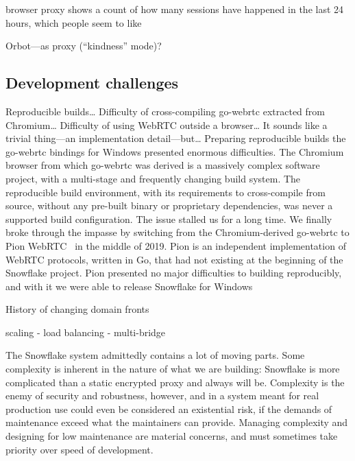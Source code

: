 \documentclass[letterpaper,twocolumn]{article}
\begin{document}
browser proxy shows a count of how many sessions
have happened in the last 24 hours,
which people seem to like

Orbot---as proxy (``kindness'' mode)?

\subsection{Development challenges}
\label{sec:challenges}


Reproducible builds\ldots
Difficulty of cross-compiling go-webrtc extracted from Chromium\ldots
Difficulty of using WebRTC outside a browser\ldots
It sounds like a trivial thing---an implementation detail---but\ldots
Preparing reproducible builds the go-webrtc bindings for Windows
presented enormous difficulties.
The Chromium browser
from which go-webrtc was derived
is a massively complex software project,
with a multi-stage and frequently changing build system.
The reproducible build environment,
with its requirements to
cross-compile from source,
without any pre-built binary or proprietary dependencies,
was never a supported build configuration.
The issue stalled us for a long time.
We finally broke through the impasse
by switching from the Chromium-derived go-webrtc
to Pion WebRTC~\cite{pion-webrtc} in the middle of 2019.
Pion is an independent implementation of WebRTC protocols, written in Go,
that had not existing at the beginning of the Snowflake project.
Pion presented no major difficulties to building reproducibly,
and with it we were able to release Snowflake for Windows

History of changing domain fronts

scaling
- load balancing
- multi-bridge

The Snowflake system
admittedly contains a lot of moving parts.
Some complexity is inherent in the nature
of what we are building:
Snowflake is more complicated than a static encrypted proxy
and always will be.
Complexity is the enemy of security and robustness, however,
and in a system meant for real production use
could even be considered an existential risk,
if the demands of maintenance exceed what the maintainers can provide.
Managing complexity and designing for low maintenance
are material concerns,
and must sometimes take priority over speed of development.
\end{document}
